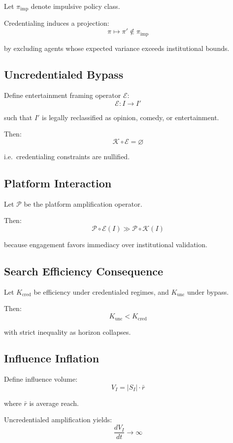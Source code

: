 \documentclass[12pt]{article}
\begin{document}
Let $\pi_{\text{imp}}$ denote impulsive policy class.

Credentialing induces a projection:
\[
\pi \mapsto \pi' \notin \pi_{\text{imp}}
\]

by excluding agents whose expected variance exceeds institutional bounds.

\subsection{Uncredentialed Bypass}

Define entertainment framing operator $\mathcal{E}$:
\[
\mathcal{E}: I \to I'
\]

such that $I'$ is legally reclassified as opinion, comedy, or entertainment.

Then:
\[
\mathcal{K} \circ \mathcal{E} = \varnothing
\]

i.e.\ credentialing constraints are nullified.

\subsection{Platform Interaction}

Let $\mathcal{P}$ be the platform amplification operator.

Then:
\[
\mathcal{P} \circ \mathcal{E}(I) \gg \mathcal{P} \circ \mathcal{K}(I)
\]

because engagement favors immediacy over institutional validation.

\subsection{Search Efficiency Consequence}

Let $K_{\text{cred}}$ be efficiency under credentialed regimes, and $K_{\text{unc}}$ under bypass.

Then:
\[
K_{\text{unc}} < K_{\text{cred}}
\]

with strict inequality as horizon collapses.

\subsection{Influence Inflation}

Define influence volume:
\[
V_I = |S_I| \cdot \bar{r}
\]

where $\bar{r}$ is average reach.

Uncredentialed amplification yields:
\[
\frac{dV_I}{dt} \to \infty
\]
\end{document}
